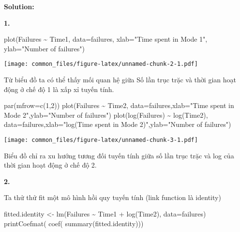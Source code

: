 \documentclass[
]{article}
\newenvironment{Shaded}{\begin{snugshade}}{\end{snugshade}}
\newcommand{\AttributeTok}[1]{\textcolor[rgb]{0.77,0.63,0.00}{#1}}
\newcommand{\DecValTok}[1]{\textcolor[rgb]{0.00,0.00,0.81}{#1}}
\newcommand{\FunctionTok}[1]{\textcolor[rgb]{0.00,0.00,0.00}{#1}}
\newcommand{\NormalTok}[1]{#1}
\newcommand{\OtherTok}[1]{\textcolor[rgb]{0.56,0.35,0.01}{#1}}
\newcommand{\SpecialCharTok}[1]{\textcolor[rgb]{0.00,0.00,0.00}{#1}}
\newcommand{\StringTok}[1]{\textcolor[rgb]{0.31,0.60,0.02}{#1}}
\begin{document}
\textbf{Solution:}

\textbf{1.}

\begin{Shaded}
\begin{Highlighting}[]
\FunctionTok{plot}\NormalTok{(Failures }\SpecialCharTok{\textasciitilde{}}\NormalTok{ Time1, }\AttributeTok{data=}\NormalTok{failures, }\AttributeTok{xlab=}\StringTok{"Time spent in Mode 1"}\NormalTok{, }\AttributeTok{ylab=}\StringTok{"Number of failures"}\NormalTok{)}
\end{Highlighting}
\end{Shaded}

\texttt{[image: common\_files/figure-latex/unnamed-chunk-2-1.pdf]}

Từ biểu đồ ta có thể thấy mối quan hệ giữa Số lần trục trặc và thời gian
hoạt động ở chế độ 1 là xấp xỉ tuyến tính.

\begin{Shaded}
\begin{Highlighting}[]
\FunctionTok{par}\NormalTok{(}\AttributeTok{mfrow=}\FunctionTok{c}\NormalTok{(}\DecValTok{1}\NormalTok{,}\DecValTok{2}\NormalTok{))}
\FunctionTok{plot}\NormalTok{(Failures }\SpecialCharTok{\textasciitilde{}}\NormalTok{ Time2, }\AttributeTok{data=}\NormalTok{failures,}\AttributeTok{xlab=}\StringTok{"Time spent in Mode 2"}\NormalTok{,}\AttributeTok{ylab=}\StringTok{"Number of failures"}\NormalTok{)}
\FunctionTok{plot}\NormalTok{(}\FunctionTok{log}\NormalTok{(Failures) }\SpecialCharTok{\textasciitilde{}} \FunctionTok{log}\NormalTok{(Time2), }\AttributeTok{data=}\NormalTok{failures,}\AttributeTok{xlab=}\StringTok{"log(Time spent in Mode 2)"}\NormalTok{,}\AttributeTok{ylab=}\StringTok{"Number of failures"}\NormalTok{)}
\end{Highlighting}
\end{Shaded}

\texttt{[image: common\_files/figure-latex/unnamed-chunk-3-1.pdf]}

Biểu đồ chỉ ra xu hướng tương đối tuyến tính giữa số lần trục trặc và
log của thời gian hoạt động ở chế độ 2.

\textbf{2.}

Ta thử thử fit một mô hình hồi quy tuyến tính (link function là
identity)

\begin{Shaded}
\begin{Highlighting}[]
\NormalTok{fitted.identity }\OtherTok{\textless{}{-}} \FunctionTok{lm}\NormalTok{(Failures }\SpecialCharTok{\textasciitilde{}}\NormalTok{ Time1 }\SpecialCharTok{+} \FunctionTok{log}\NormalTok{(Time2), }\AttributeTok{data=}\NormalTok{failures)}
\FunctionTok{printCoefmat}\NormalTok{( }\FunctionTok{coef}\NormalTok{( }\FunctionTok{summary}\NormalTok{(fitted.identity)))}
\end{Highlighting}
\end{Shaded}
\end{document}

